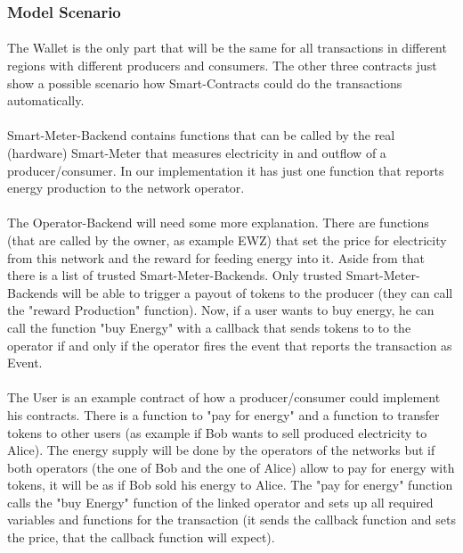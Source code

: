 \documentclass{scrartcl}
\begin{document}
	\subsubsection{Model Scenario}
	
	\paragraph{}
	The Wallet is the only part that will be the same for all transactions in different regions with different producers and consumers. The other three contracts just show a possible scenario how Smart-Contracts could do the transactions automatically.
	
	\paragraph{}
	Smart-Meter-Backend contains functions that can be called by the real (hardware) Smart-Meter that measures electricity in and outflow of a producer/consumer. In our implementation it has just one function that reports energy production to the network operator.
	
	\paragraph{}
	The Operator-Backend will need some more explanation. There are functions (that are called by the owner, as example EWZ) that set the price for electricity from this network and the reward for feeding energy into it. Aside from that there is a list of trusted Smart-Meter-Backends. Only trusted Smart-Meter-Backends will be able to trigger a payout of tokens to the producer (they can call the "reward Production" function). Now, if a user wants to buy energy, he can call the function "buy Energy" with a callback that sends tokens to to the operator if and only if the operator fires the event that reports the transaction as Event.
	
	\paragraph{}
	The User is an example contract of how a producer/consumer could implement his contracts. There is a function to "pay for energy" and a function to transfer tokens to other users (as example if Bob wants to sell produced electricity to Alice). The energy supply will be done by the operators of the networks but if both operators (the one of Bob and the one of Alice) allow to pay for energy with tokens, it will be as if Bob sold his energy to Alice. The "pay for energy" function calls the "buy Energy" function of the linked operator and sets up all required variables and functions for the transaction (it sends the callback function and sets the price, that the callback function will expect).
	
\end{document}
